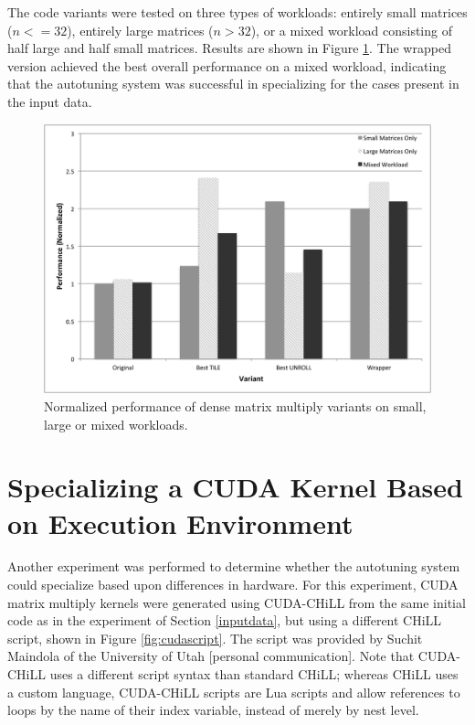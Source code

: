 \documentclass[msthesis,justified,copyright,final,numbers,sort&compress,
gsmodern,amstex,natbib]{uothesis}
\begin{document}
The code variants were tested on three types of workloads: entirely small matrices ($n <= 32$), entirely large matrices ($n > 32$), or a mixed workload consisting of half large and half small matrices.  Results are shown in Figure \ref{fig:perf_chart}. The wrapped version achieved the best overall performance on a mixed workload, indicating that the autotuning system was successful in specializing for the cases present in the input data.

\begin{figure}[btp]
\centering
\includegraphics[width=\textwidth]{perf_chart.pdf}
\caption[Normalized performance of dense matrix multiply variants]{Normalized performance of dense matrix multiply variants on small, large or mixed workloads.}
\label{fig:perf_chart}
\end{figure}

\section{Specializing a CUDA Kernel Based on Execution Environment}
\label{cudakernel}

Another experiment was performed to determine whether the autotuning system could specialize based upon differences in hardware. For this experiment, CUDA matrix multiply kernels were generated using CUDA-CHiLL \cite{rudy} from the same initial code as in the experiment of Section \ref{inputdata}, but using a different CHiLL script, shown in Figure \ref{fig:cudascript}. The script was provided by Suchit Maindola of the University of Utah [personal communication]. Note that CUDA-CHiLL uses a different script syntax than standard CHiLL; whereas CHiLL uses a custom language, CUDA-CHiLL scripts are Lua scripts and allow references to loops by the name of their index variable, instead of merely by nest level.
\end{document}
